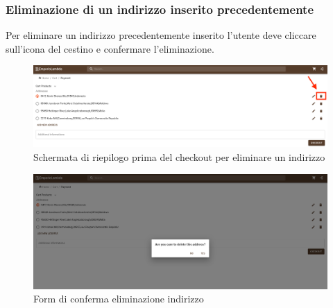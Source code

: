 \subsubsection{Eliminazione di un indirizzo inserito precedentemente}
Per eliminare un indirizzo precedentemente inserito l'utente deve cliccare sull'icona del cestino e confermare l'eliminazione.
\begin{figure}[H]
	\centering
	\includegraphics[scale=0.25]{Immagini/Acquirente/payment.addressdelete.png}
	\caption{Schermata di riepilogo prima del checkout per eliminare un indirizzo}
	\label{fig:DeleteAddress}
\end{figure}
\begin{figure}[H]
	\centering
	\includegraphics[scale=0.25]{Immagini/Acquirente/payment-delete-address.customer.png}
	\caption{Form di conferma eliminazione indirizzo}
	\label{fig:CartDeleteAddress}
\end{figure}
